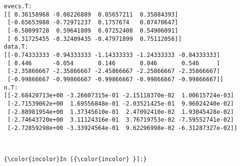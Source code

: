 \documentclass[11pt]{article}
\begin{document}
    \begin{Verbatim}[commandchars=\\\{\}]
evecs.T: 
[[ 0.36158968 -0.08226889  0.85657211  0.35884393]
 [-0.65653988 -0.72971237  0.1757674   0.07470647]
 [-0.58099728  0.59641809  0.07252408  0.54906091]
 [ 0.31725455 -0.32409435 -0.47971899  0.75112056]]
data.T: 
[[-0.74333333 -0.94333333 -1.14333333 -1.24333333 -0.84333333]
 [ 0.446      -0.054       0.146       0.046       0.546     ]
 [-2.35866667 -2.35866667 -2.45866667 -2.25866667 -2.35866667]
 [-0.99866667 -0.99866667 -0.99866667 -0.99866667 -0.99866667]]
n.T:
[[-2.68420713e+00 -3.26607315e-01 -2.15118370e-02  1.00615724e-03]
 [-2.71539062e+00  1.69556848e-01 -2.03521425e-01  9.96024240e-02]
 [-2.88981954e+00  1.37345610e-01  2.47092410e-02  1.93045428e-02]
 [-2.74643720e+00  3.11124316e-01  3.76719753e-02 -7.59552741e-02]
 [-2.72859298e+00 -3.33924564e-01  9.62296998e-02 -6.31287327e-02]]

    \end{Verbatim}

    \begin{center}
    \end{center}
    { \hspace*{\fill} \\}
    
    \begin{Verbatim}[commandchars=\\\{\}]
{\color{incolor}In [{\color{incolor} }]:} 
\end{Verbatim}
\end{document}
